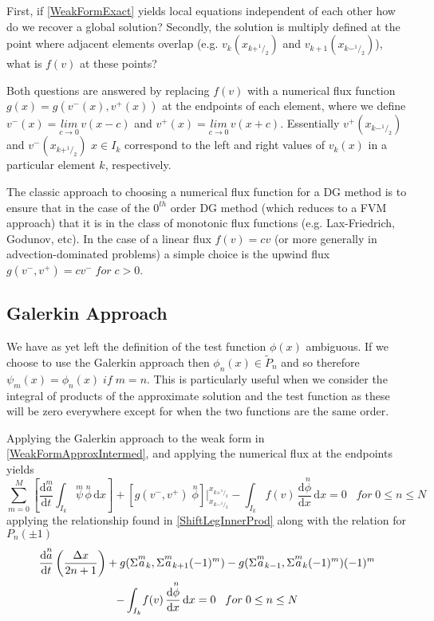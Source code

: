 \documentclass[letterpaper]{article}
\begin{document}
First, if \eqref{WeakFormExact} yields local equations independent of each other how do we recover a global solution? Secondly, the solution is multiply defined at the point where adjacent elements overlap (e.g. $v_k(x_{k+^1\!/_2})$ and $v_{k+1}(x_{k-^1\!/_2})$\;), what is $f(v)$ at these points?

Both questions are answered by replacing $f(v)$ with a numerical flux function $g(x) = g(v^-(x),v^+(x))$ at the endpoints of each element, where we define $v^-(x) = \underset{c \to 0}{lim} \,v(x-c)$ and $v^+(x) = \underset{c \to 0}{lim} \,v(x+c)$. Essentially $v^+(x_{k-^1\!/_2})$ and $v^-(x_{k+^1\!/_2})$ $x \in I_k$ correspond to the left and right values of $v_k(x)$ in a particular element $k$, respectively.

The classic approach to choosing a numerical flux function for a DG method is to ensure that in the case of the $0^{th}$ order DG method (which reduces to a FVM approach) that it is in the class of monotonic flux functions (e.g. Lax-Friedrich, Godunov, etc). In the case of a linear flux $f(v) = cv$ (or more generally in advection-dominated problems) a simple choice is the upwind flux $g(v^-,v^+) = cv^- \;for\; c>0$.

\subsection{Galerkin Approach}
We have as yet left the definition of the test function $\phi(x)$ ambiguous. If we choose to use the Galerkin approach then $\phi_n(x) \in \tilde{P}_n$ and so therefore $\psi_m(x) = \phi_n(x) \;if\; m=n$. This is particularly useful when we consider the integral of products of the approximate solution and the test function as these will be zero everywhere except for when the two functions are the same order.

Applying the Galerkin approach to the weak form in \eqref{WeakFormApproxIntermed}, and applying the numerical flux at the endpoints yields
	\begin{equation}\label{WeakFormNumFluxIntermed}
	\sum_{m=0}^M \left[ \frac{\mathrm{d}\overset{m}{a}}{\mathrm{d} t} \int_{I_k}\! \overset{m}{\psi} \, \overset{n}{\phi} \,\mathrm{d}x \right] + 
	[g(v^-,v^+) \; \overset{n}{\phi}] \Big\rvert_{x_{k-^1\!/_2}}^{x_{k+^1\!/_2}} -  
	\int_{I_k}\! f(v) \,\frac{\mathrm{d} \overset{n}{\phi}}{\mathrm{d} x} \,\mathrm{d}x = 0
	\;\;\; for \; 0 \leq n \leq N
	\end{equation}
applying the relationship found in \eqref{ShiftLegInnerProd} along with the relation for $P_n(\pm 1)$
	\begin{gather}\label{WeakFormNumFlux}
	\frac{\mathrm{d}\overset{n}{a}}{\mathrm{d} t}\left(\frac{\Delta x}{2n+1}\right)
	+ g(\Sigma \overset{m}{a}_k,\Sigma \overset{m}{a}_{k+1}(-1)^m) - g(\Sigma \overset{m}{a}_{k-1},\Sigma \overset{m}{a}_{k}(-1)^m) (-1)^m\\
	- \int_{I_k}\! f(v) \,\frac{\mathrm{d} \overset{n}{\phi}}{\mathrm{d} x} \,\mathrm{d}x = 0
	\;\;\; for \; 0 \leq n \leq N \notag
	\end{gather}
\end{document}
